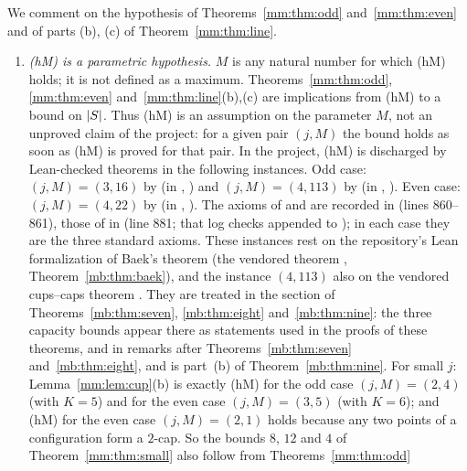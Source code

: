 \begin{remark}\label{mm:rem:hm}
We comment on the hypothesis of Theorems~\ref{mm:thm:odd} and~\ref{mm:thm:even} and of parts (b), (c) of Theorem~\ref{mm:thm:line}.
\begin{enumerate}[label=(\arabic*)]
\item \emph{(hM) is a parametric hypothesis.} $M$ is any natural number for which (hM) holds; it is not
  defined as a maximum. Theorems~\ref{mm:thm:odd}, \ref{mm:thm:even} and~\ref{mm:thm:line}(b),(c) are
  implications from (hM) to a bound on $\lvert S\rvert$. Thus (hM) is an assumption on the parameter $M$, not an
  unproved claim of the project: for a given pair $(j,M)$ the bound holds as soon as (hM) is proved for that
  pair. In the project, (hM) is discharged by Lean-checked theorems in the following instances. Odd case:
  $(j,M)=(3,16)$ by  (in ,
  ) and $(j,M)=(4,113)$ by  (in
  , ). Even case:
  $(j,M)=(4,22)$ by  (in ,
  ). The axioms of  and 
  are recorded in  (lines 860--861), those of 
  in  (line 881; that log checks
   appended to ); in each
  case they are the three standard axioms. These instances rest on the repository's Lean formalization of
  Baek's theorem (the vendored theorem , Theorem~\ref{mb:thm:baek}), and the instance
  $(4,113)$ also on the vendored cups--caps theorem . They are treated in the section
  of Theorems~\ref{mb:thm:seven}, \ref{mb:thm:eight} and~\ref{mb:thm:nine}: the three capacity bounds
  appear there as statements used in the proofs of these theorems,  and
   in remarks after Theorems~\ref{mb:thm:seven} and~\ref{mb:thm:eight}, and
   is part~(b) of Theorem~\ref{mb:thm:nine}. For small $j$:
  Lemma~\ref{mm:lem:cup}(b) is exactly (hM) for the odd case
  $(j,M)=(2,4)$ (with $K=5$) and for the even case $(j,M)=(3,5)$ (with $K=6$); and (hM) for the even case
  $(j,M)=(2,1)$ holds because any two points of a configuration form a $2$-cap. So the bounds $8$, $12$
  and $4$ of Theorem~\ref{mm:thm:small} also follow from Theorems~\ref{mm:thm:odd}

\end{enumerate}
\end{remark}
